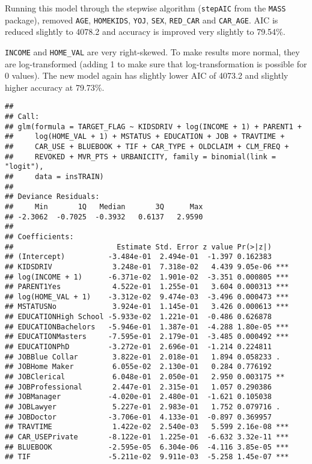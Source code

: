 \documentclass[]{article}
\begin{document}
Running this model through the stepwise algorithm (\texttt{stepAIC} from
the \texttt{MASS} package), removed \texttt{AGE}, \texttt{HOMEKIDS},
\texttt{YOJ}, \texttt{SEX}, \texttt{RED\_CAR} and \texttt{CAR\_AGE}. AIC
is reduced slightly to 4078.2 and accuracy is improved very slightly to
79.54\%.

\texttt{INCOME} and \texttt{HOME\_VAL} are very right-skewed. To make
results more normal, they are log-transformed (adding 1 to make sure
that log-transformation is possible for 0 values). The new model again
has slightly lower AIC of 4073.2 and slightly higher accuracy at
79.73\%.

\begin{verbatim}
## 
## Call:
## glm(formula = TARGET_FLAG ~ KIDSDRIV + log(INCOME + 1) + PARENT1 + 
##     log(HOME_VAL + 1) + MSTATUS + EDUCATION + JOB + TRAVTIME + 
##     CAR_USE + BLUEBOOK + TIF + CAR_TYPE + OLDCLAIM + CLM_FREQ + 
##     REVOKED + MVR_PTS + URBANICITY, family = binomial(link = "logit"), 
##     data = insTRAIN)
## 
## Deviance Residuals: 
##     Min       1Q   Median       3Q      Max  
## -2.3062  -0.7025  -0.3932   0.6137   2.9590  
## 
## Coefficients:
##                        Estimate Std. Error z value Pr(>|z|)    
## (Intercept)          -3.484e-01  2.494e-01  -1.397 0.162383    
## KIDSDRIV              3.248e-01  7.318e-02   4.439 9.05e-06 ***
## log(INCOME + 1)      -6.371e-02  1.901e-02  -3.351 0.000805 ***
## PARENT1Yes            4.522e-01  1.255e-01   3.604 0.000313 ***
## log(HOME_VAL + 1)    -3.312e-02  9.474e-03  -3.496 0.000473 ***
## MSTATUSNo             3.924e-01  1.145e-01   3.426 0.000613 ***
## EDUCATIONHigh School -5.933e-02  1.221e-01  -0.486 0.626878    
## EDUCATIONBachelors   -5.946e-01  1.387e-01  -4.288 1.80e-05 ***
## EDUCATIONMasters     -7.595e-01  2.179e-01  -3.485 0.000492 ***
## EDUCATIONPhD         -3.272e-01  2.696e-01  -1.214 0.224811    
## JOBBlue Collar        3.822e-01  2.018e-01   1.894 0.058233 .  
## JOBHome Maker         6.055e-02  2.130e-01   0.284 0.776192    
## JOBClerical           6.048e-01  2.050e-01   2.950 0.003175 ** 
## JOBProfessional       2.447e-01  2.315e-01   1.057 0.290386    
## JOBManager           -4.020e-01  2.480e-01  -1.621 0.105038    
## JOBLawyer             5.227e-01  2.983e-01   1.752 0.079716 .  
## JOBDoctor            -3.706e-01  4.133e-01  -0.897 0.369957    
## TRAVTIME              1.422e-02  2.540e-03   5.599 2.16e-08 ***
## CAR_USEPrivate       -8.122e-01  1.225e-01  -6.632 3.32e-11 ***
## BLUEBOOK             -2.595e-05  6.304e-06  -4.116 3.85e-05 ***
## TIF                  -5.211e-02  9.911e-03  -5.258 1.45e-07 ***

\end{verbatim}
\end{document}
